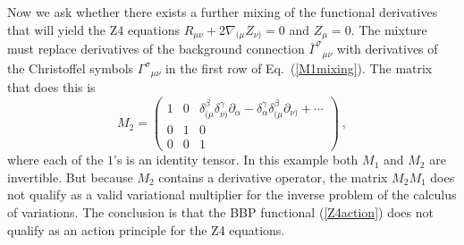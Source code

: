 \documentclass[letterpaper,nofootinbib,prd,amsmath,twocolumn]{revtex4-1}
\begin{document}
Now we ask whether there exists a further mixing of the functional derivatives that will yield the 
Z4 equations $R_{\mu\nu} + 2\nabla_{(\mu} Z_{\nu)} = 0$ and $Z_\mu= 0$.  The mixture must replace  
derivatives of the background connection $\bar\Gamma^\sigma{}_{\mu\nu}$ with derivatives 
of the Christoffel symbols $\Gamma^\sigma{}_{\mu\nu} $ in the first row of Eq.~(\ref{M1mixing}). 
The matrix that does this is 
\begin{equation}
      M_2 = \left( \begin{array}{ccc} 1 & 0 & \delta_{(\mu}^\beta \delta_{\nu)}^\gamma\partial_\alpha
      - \delta_\alpha^\gamma \delta_{(\mu}^\beta \partial_{\nu)} + \cdots \\
      0 & 1 & 0 \\
      0 & 0 & 1 \end{array} \right)  \ ,
\end{equation}
where each of the $1$'s is an identity tensor. In this example both $M_1$ and $M_2$ are invertible. 
But because $M_2$ contains a derivative operator, the matrix 
$M_2 M_1$ does not qualify as a valid variational multiplier for the inverse problem of the 
calculus of variations. 
The conclusion is that the BBP functional (\ref{Z4action}) does not qualify as an action principle for the Z4 
equations. 
\end{document}
